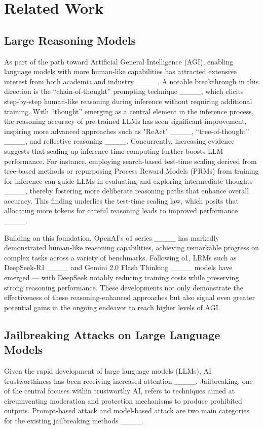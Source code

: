 \section{Related Work}
\subsection{Large Reasoning Models}

As part of the path toward Artificial General Intelligence (AGI), enabling language models with more human-like capabilities has attracted extensive interest from both academia and industry ____. A notable breakthrough in this direction is the “chain-of-thought” prompting technique ____, which elicits step-by-step human-like reasoning during inference without requiring additional training. With “thought” emerging as a central element in the inference process, the reasoning accuracy of pre-trained LLMs has seen significant improvement, inspiring more advanced approaches such as "ReAct" ____, “tree-of-thought” ____, and reflective reasoning ____. Concurrently, increasing evidence suggests that scaling up inference-time computing further boosts LLM performance. For instance, employing search-based test-time scaling derived from tree-based methods or repurposing Process Reward Models (PRMs) from training for inference can guide LLMs in evaluating and exploring intermediate thoughts ____, thereby fostering more deliberate reasoning paths that enhance overall accuracy. This finding underlies the test-time scaling law, which posits that allocating more tokens for careful reasoning leads to improved performance ____.

Building on this foundation, OpenAI’s o1 series ____ has markedly demonstrated human-like reasoning capabilities, achieving remarkable progress on complex tasks across a variety of benchmarks. Following o1, LRMs such as DeepSeek-R1 ____ and Gemini 2.0 Flash Thinking ____ models have emerged — with DeepSeek notably reducing training costs while preserving strong reasoning performance. These developments not only demonstrate the effectiveness of these reasoning-enhanced approaches but also signal even greater potential gains in the ongoing endeavor to reach higher levels of AGI.

\subsection{Jailbreaking Attacks on Large Language Models}
Given the rapid development of large language models (LLMs), AI trustworthiness has been receiving increased attention ____. Jailbreaking, one of the central focuses within trustworthy AI, refers to techniques aimed at circumventing moderation and protection mechanisms to produce prohibited outputs. Prompt-based attack and model-based attack are two main categories for the existing jailbreaking methods ____. 


